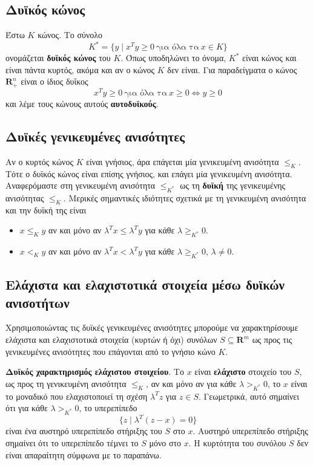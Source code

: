 \subsection{Δυϊκός κώνος} Έστω $K$ κώνος. Το σύνολο
\begin{equation*}
    K^* = \{y \mid x^T y \geq 0 \ \text{για όλα τα} \ x \in K\}
\end{equation*}
ονομάζεται \textbf{δυϊκός κώνος} του $K$. Όπως υποδηλώνει το όνομα, $K^*$ είναι
κώνος και είναι πάντα κυρτός, ακόμα και αν ο κώνος $K$ δεν είναι. Για
παραδείγματα ο κώνος $\mathbf{R}^n_+$ είναι ο ίδιος δυΐκος
\begin{equation*}
    x^Ty \geq 0 \ \text{για όλα τα} \ x \geq 0 \Leftrightarrow y \geq 0
\end{equation*}
και λέμε τους κώνους αυτούς \textbf{αυτοδυϊκούς}.

\subsection{Δυϊκές γενικευμένες ανισότητες} Αν ο κυρτός κώνος $K$ είναι γνήσιος,
άρα επάγεται μία γενικευμένη ανισότητα $\leq_K$. Τότε ο δυϊκός κώνος είναι
επίσης γνήσιος, και επάγει μία γενικευμένη ανισότητα. Αναφερόμαστε στη
γενικευμένη ανισότητα $\leq_{K^*}$ ως τη \textbf{δυϊκή} της γενικευμένης
ανισότητας $\leq_{K}$. Μερικές σημαντικές ιδιότητες σχετικά με τη γενικευμένη
ανισότητα και την δυϊκή της είναι
\begin{itemize}
    \item $x \leq_K y$ αν και μόνο αν $\lambda^T x \leq \lambda^T y$ για κάθε
        $\lambda \geq_{K^*} 0$.
    \item $x <_K y$ αν και μόνο αν $\lambda^T x < \lambda^T y$ για κάθε
        $\lambda \geq_{K^*} 0$, $\lambda \neq 0$.
\end{itemize}

\subsection{Ελάχιστα και ελαχιστοτικά στοιχεία μέσω δυϊκών ανισοτήτων}

Χρησιμοποιώντας τις δυϊκές γενικευμένες ανισότητες μπορούμε να χαρακτηρίσουμε
ελάχιστα και ελαχιστοτικά στοιχεία (κυρτών ή όχι) συνόλων $S \subseteq
\mathbf{R}^m$ ως προς τις γενικευμένες ανισότητες που επάγονται από το γνήσιο
κώνο $K$.

\textbf{Δυϊκός χαρακτηρισμός ελάχιστου στοιχείου}. Το $x$ είναι
\textbf{ελάχιστο} στοιχείο του $S$, ως προς τη γενικευμένη ανισότητα $\leq_K$,
αν και μόνο αν για κάθε $\lambda >_{K^*} 0$, το $x$ είναι το μοναδικό που
ελαχιστοποιεί τη σχέση $\lambda^T z$ για $z \in S$. Γεωμετρικά, αυτό σημαίνει ότι για
κάθε $\lambda >_{K^*} 0$, το υπερεπίπεδο
\begin{equation*}
    \{z \mid \lambda^T(z - x) = 0\}
\end{equation*}
είναι ένα αυστηρό υπερεπίπεδο στήριξης του $S$ στο $x$. Αυστηρό
υπερεπίπεδο στήριξης σημαίνει ότι το υπερεπίπεδο τέμνει το $S$ μόνο
στο $x$. Η κυρτότητα του συνόλου $S$ δεν είναι απαραίτητη σύμφωνα με το
παραπάνω.

